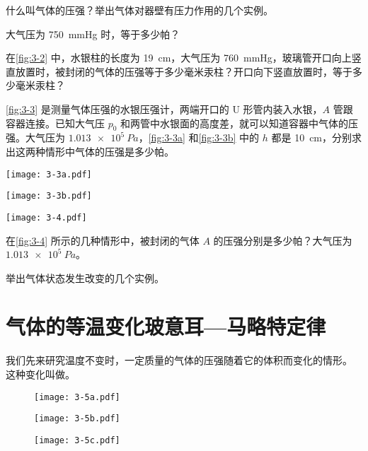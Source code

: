 \begin{Practice}
\begin{question}
	\item 什么叫气体的压强？举出气体对器壁有压力作用的几个实例。
	\item 大气压为 \qty{750}{mmHg} 时，等于多少帕？
	\item 在\cref{fig:3-2} 中，水银柱的长度为 \qty{19}{cm}，大气压为 \qty{760}{mmHg}，玻璃管开口向上竖直放置时，被封闭的气体的压强等于多少毫米汞柱？开口向下竖直放置时，等于多少毫米汞柱？
	\item \cref{fig:3-3} 是测量气体压强的水银压强计，两端开口的 U 形管内装入水银，$A$ 管跟容器连接。已知大气压 $p_0$ 和两管中水银面的高度差，就可以知道容器中气体的压强。大气压为 $\qty{1.013e5}{Pa}$，\cref{fig:3-3a} 和\cref{fig:3-3b} 中的 $h$ 都是 \qty{10}{cm}，分别求出这两种情形中气体的压强是多少帕。
	\begin{figurehere}
		\nextfloat
		\begin{minipage}[b]{0.4\linewidth}
		\begin{minipage}{0.5\linewidth}\centering
			\texttt{[image: 3-3a.pdf]}
			\subcaption{}\label{fig:3-3a}
		\end{minipage}%
		\begin{minipage}{0.5\linewidth}\centering
			\texttt{[image: 3-3b.pdf]}
			\subcaption{}\label{fig:3-3b}
		\end{minipage}
		\caption{}\label{fig:3-3}
		\end{minipage}%
		\nextfloat
    \begin{minipage}[b]{0.6\linewidth}\centering
			\texttt{[image: 3-4.pdf]}
			\caption{}\label{fig:3-4}
		\end{minipage}
	\end{figurehere}
	\item 在\cref{fig:3-4} 所示的几种情形中，被封闭的气体 $A$ 的压强分别是多少帕？大气压为 $\qty{1.013e5}{Pa}$。
	\item 举出气体状态发生改变的几个实例。
\end{question}
\end{Practice}

\section{气体的等温变化\texorpdfstring{\quad}{ }玻意耳—马略特定律}
我们先来研究温度不变时，一定质量的气体的压强随着它的体积而变化的情形。
这种变化叫做。
\begin{figure}
	\begin{minipage}[b]{0.15\linewidth}\centering
		\texttt{[image: 3-5a.pdf]}
		\subcaption{}\label{fig:3-5a}
	\end{minipage}
	\begin{minipage}[b]{0.15\linewidth}\centering
		\texttt{[image: 3-5b.pdf]}
		\subcaption{}\label{fig:3-5b}
	\end{minipage}
	\begin{minipage}[b]{0.15\linewidth}\centering
		\texttt{[image: 3-5c.pdf]}
		\subcaption{}\label{fig:3-5c}
	\end{minipage}
	\caption{}\label{fig:3-5}
\end{figure}

